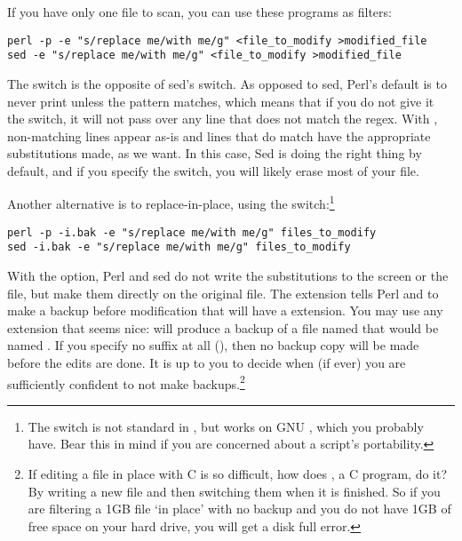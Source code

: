 If you have only one file to scan, you can use these programs as
filters:
\begin{lstlisting}
perl -p -e "s/replace me/with me/g" <file_to_modify >modified_file
sed -e "s/replace me/with me/g" <file_to_modify >modified_file
\end{lstlisting}


The  switch is the opposite of sed's  switch.
As opposed to sed, Perl's default is to never print
unless the pattern matches, which means that if you do not give it the
 switch, it will not pass over any line that does not match the regex.
With , non-matching lines appear as-is and lines that do match
have the appropriate substitutions made, as we want. 
In this case, Sed is doing the right thing by default, and if you specify
the  switch, you will likely erase
most of your file. 


Another alternative is to replace-in-place, using the 
switch:\footnote{The  switch is not standard in , but
works on GNU , which you probably have. Bear this in mind if you
are concerned about a script's portability.}
\begin{lstlisting}
perl -p -i.bak -e "s/replace me/with me/g" files_to_modify
sed -i.bak -e "s/replace me/with me/g" files_to_modify
\end{lstlisting}
With the  option, Perl and sed do not write
the substitutions to the screen or the \bi{>} file, but
make them directly on the original file.
The  extension tells Perl
and  to make a backup before modification that will have a  extension.
You may use any extension that seems nice:  will produce
a backup of a file named  that would be named .
If you specify no suffix at all (), then no backup copy will be
made before the edits are done. It is up to you to decide when (if ever)
you are sufficiently confident to not make backups.\footnote{If editing a file in
place with C is so difficult, how does , a C program, do it? By
writing a new file and then switching them when it is finished. So if you
are filtering a 1GB file `in place' with no backup and you do not have
1GB of free space on your hard drive, you will get a disk full error.}

